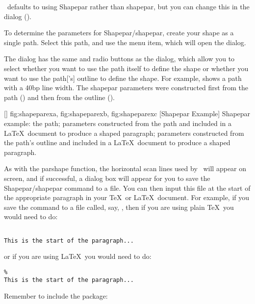 \begin{information}
\FlowframTk\ defaults to using \gls{Shapepar} rather than
\gls{shapepar}, but you can change this in the
 dialog ().
\end{information}

To determine the parameters for \gls{Shapepar}\slash\gls{shapepar}, create
your shape as a single \gls*{path}. Select this \gls*{path}, and use
the  menu item, which will open the
 dialog.


The  dialog has the same 
and  radio buttons as the
 dialog, which allow you to select
whether you want to use the \gls*{path} itself to define the shape
or whether you want to use the \gls*{path}['s] outline to define the shape.
For example,  shows a \gls*{path} with a
40bp line width. The \gls{shapepar} parameters were constructed
first from the \gls*{path} () and then from
the outline ().

[\small]
{
  {fig:shapeparexa}{}{},
  {fig:shapeparexb}{}{},
  {fig:shapeparexc}{}{}
}
[Shapepar Example]
{Shapepar example:
 the path;
 parameters constructed from the path and included in a
\LaTeX\ document to produce a shaped paragraph;
parameters constructed from the path's outline and included in a
\LaTeX\ document to produce a shaped paragraph.}

As with the parshape function, the horizontal
scan lines used by \FlowframTk\ will appear on screen, and if
successful, a dialog box will appear for you to save the
\gls{Shapepar}\slash\gls{shapepar} command to a file. You can then input this
file at the start of the appropriate paragraph in your \TeX\ or
\LaTeX\ document. For example, if you save the
command to a file called, say, , then if
you are using plain \TeX\ you would need to do:
\begin{verbatim}

This is the start of the paragraph...
\end{verbatim}
or if you are using \LaTeX\ you would need to do:
\begin{verbatim}
%
This is the start of the paragraph...
\end{verbatim}
Remember to include the  package:


